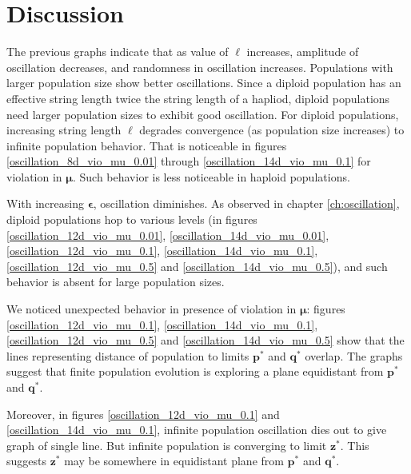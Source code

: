\section{Discussion}
The previous graphs indicate that as value of $\ell$ increases, 
amplitude of oscillation decreases, and randomness in oscillation increases. 
Populations with larger population size show better oscillations. 
Since a diploid population has an effective string length twice the string length of a hapliod, 
diploid populations need larger population sizes to exhibit good oscillation. 
For diploid populations, increasing string length $\ell$ 
degrades convergence (as population size increases) to infinite population behavior. 
That is noticeable in figures 
\ref{oscillation_8d_vio_mu_0.01} through \ref{oscillation_14d_vio_mu_0.1} for violation in $\bm{\mu}$. 
Such behavior is less noticeable in haploid populations. 

With increasing $\bm{\epsilon}$, oscillation diminishes.  
As observed in chapter \ref{ch:oscillation}, diploid populations hop to various levels 
(in figures \ref{oscillation_12d_vio_mu_0.01}, \ref{oscillation_14d_vio_mu_0.01}, \ref{oscillation_12d_vio_mu_0.1}, 
\ref{oscillation_14d_vio_mu_0.1}, \ref{oscillation_12d_vio_mu_0.5} and \ref{oscillation_14d_vio_mu_0.5}), 
and such behavior is absent for large population sizes.

We noticed unexpected behavior in presence of violation in $\bm{\mu}$: 
figures \ref{oscillation_12d_vio_mu_0.1}, \ref{oscillation_14d_vio_mu_0.1}, \ref{oscillation_12d_vio_mu_0.5} and \ref{oscillation_14d_vio_mu_0.5} 
show that the lines representing distance of population to limits $\bm{p}^\ast$ and $\bm{q}^\ast$ overlap. 
The graphs suggest that finite population evolution is exploring a plane equidistant from $\bm{p}^\ast$ and $\bm{q}^\ast$.

Moreover, in figures \ref{oscillation_12d_vio_mu_0.1} and \ref{oscillation_14d_vio_mu_0.1}, infinite population oscillation dies out to 
give graph of single line. But infinite population is converging to limit $\bm{z}^\ast$. 
This suggests $\bm{z}^\ast$ may be somewhere in equidistant plane from $\bm{p}^\ast$ and $\bm{q}^\ast$.

